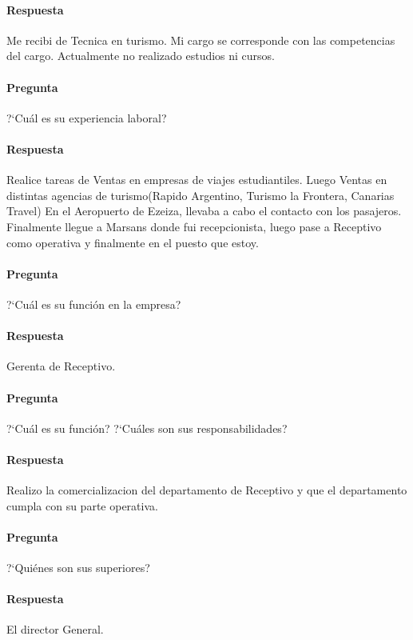 \documentclass[12pt,a4paper,spanish]{article}
\begin{document}
	\paragraph{Respuesta}
Me recibi de Tecnica en turismo.
Mi cargo se corresponde con las competencias del cargo.
Actualmente no realizado estudios ni cursos.

	\paragraph{Pregunta}
	 ?`Cu\'al es su experiencia laboral?
	\paragraph{Respuesta}
Realice tareas de Ventas en empresas de viajes estudiantiles.
Luego Ventas en distintas agencias de turismo(Rapido Argentino, Turismo la Frontera, Canarias Travel)
En el Aeropuerto de Ezeiza, llevaba a cabo el contacto con los pasajeros.
Finalmente llegue a Marsans donde fui recepcionista, luego pase a Receptivo como operativa y finalmente en el puesto que estoy.

	\paragraph{Pregunta}
	 ?`Cu\'al es su funci\'on en la empresa?
	\paragraph{Respuesta}
	Gerenta de Receptivo.
	\paragraph{Pregunta}
	 ?`Cu\'al es su funci\'on?  ?`Cu\'ales son sus responsabilidades?
	\paragraph{Respuesta}
	Realizo la comercializacion del departamento de Receptivo y que el departamento cumpla con su parte operativa.
	
	\paragraph{Pregunta}
	 ?`Qui\'enes son sus superiores? 
	\paragraph{Respuesta}
El director General.
\end{document}
